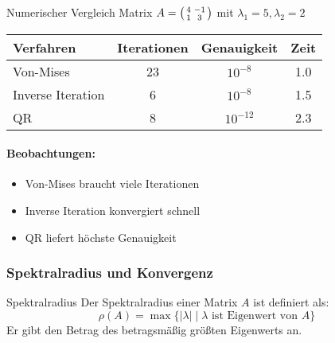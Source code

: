 \begin{example2}{Numerischer Vergleich}
\small
Matrix $A = \begin{psmallmatrix} 4 & -1 \\ 1 & 3 \end{psmallmatrix}$ mit $\lambda_1 = 5, \lambda_2 = 2$
\begin{center}
\begin{tabular}{l|c|c|c}
Verfahren & Iterationen & Genauigkeit & Zeit\\
\hline
Von-Mises & 23 & $10^{-8}$ & 1.0\\
Inverse Iteration & 6 & $10^{-8}$ & 1.5\\  
QR & 8 & $10^{-12}$ & 2.3\\
\end{tabular}
\end{center}

\paragraph{Beobachtungen:}
\begin{itemize}
    \item Von-Mises braucht viele Iterationen
    \item Inverse Iteration konvergiert schnell
    \item QR liefert höchste Genauigkeit
\end{itemize}
\end{example2}

\subsubsection{Spektralradius und Konvergenz}

\begin{definition}{Spektralradius}
Der Spektralradius einer Matrix $A$ ist definiert als:
$$\rho(A) = \max\{|\lambda| \mid \lambda \text{ ist Eigenwert von } A\}$$
Er gibt den Betrag des betragsmäßig größten Eigenwerts an.
\end{definition}


